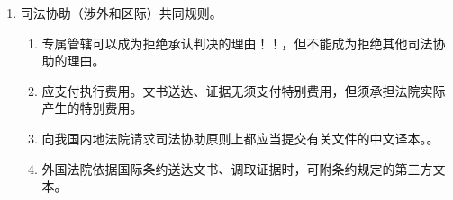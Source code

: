 \begin{enumerate}
        \begin{kk}{港澳仲裁裁决的相互协助保全}
          \begin{enumerate}
            \item 范围。证据、行为和财产保全。
            \item 内地出中院（但只能找一个申请），香港高等法院，澳门初级法院。主体仅澳门变为初级法院。
            \item 保全的程序、费用、救济和方式依据被请求方法律规定。
          \end{enumerate}
        \end{kk}
  \item 司法协助（涉外和区际）共同规则。
        \begin{enumerate}
          \item 专属管辖可以成为拒绝承认判决的理由！！，但不能成为拒绝其他司法协助的理由。
          \item 应支付执行费用。文书送达、证据无须支付特别费用，但须承担法院实际产生的特别费用。
          \item 向我国内地法院请求司法协助原则上都应当提交有关文件的中文译本。。
          \item 外国法院依据国际条约送达文书、调取证据时，可附条约规定的第三方文本。
        \end{enumerate}
\end{enumerate}
